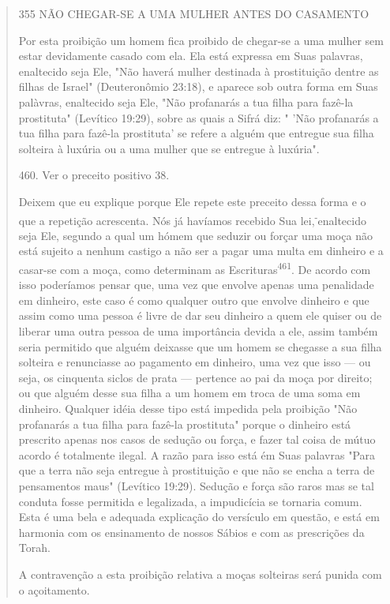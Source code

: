\begin{quote}
355 NÃO CHEGAR-SE A UMA MULHER ANTES DO CASAMENTO

Por esta proibição um homem fica proibido de chegar-se a uma mu­lher sem
estar devidamente casado com ela. Ela está expressa em Suas palavras,
enaltecido seja Ele, "Não haverá mulher destinada à prostituição dentre
as fi­lhas de Israel" (Deuteronômio 23:18), e aparece sob outra forma em
Suas palà­vras, enaltecido seja Ele, "Não profanarás a tua filha para
fazê-la prostituta" (Le­vítico 19:29), sobre as quais a Sifrá diz: "
'Não profanarás a tua filha para fazê-la prostituta' se refere a alguém
que entregue sua filha solteira à luxúria ou a uma mulher que se
entregue à luxúria".

460. Ver o preceito positivo 38.

Deixem que eu explique porque Ele repete este preceito dessa forma e o
que a repetição acrescenta. Nós já havíamos recebido Sua
lei,\textsuperscript{-}enaltecido seja Ele, segundo a qual um hómem que
seduzir ou forçar uma moça não está sujeito a nenhum castigo a não ser a
pagar uma multa em dinheiro e a casar-se com a moça, como determinam as
Escrituras\textsuperscript{461}. De acordo com isso poderíamos pen­sar
que, uma vez que envolve apenas uma penalidade em dinheiro, este caso é
como qualquer outro que envolve dinheiro e que assim como uma pessoa é
livre de dar seu dinheiro a quem ele quiser ou de liberar uma outra
pessoa de uma importância devida a ele, assim também seria permitido que
alguém deixas­se que um homem se chegasse a sua filha solteira e
renunciasse ao pagamento em dinheiro, uma vez que isso --- ou seja, os
cinquenta siclos de prata --- perten­ce ao pai da moça por direito; ou
que alguém desse sua filha a um homem em troca de uma soma em dinheiro.
Qualquer idéia desse tipo está impedida pela proibição "Não profanarás a
tua filha para fazê-la prostituta" porque o dinheiro está prescrito
apenas nos casos de sedução ou força, e fazer tal coisa de mútuo acordo
é totalmente ilegal. A razão para isso está ém Suas palavras "Para que a
terra não seja entregue à prostituição e que não se encha a terra de
pensamentos maus" (Levítico 19:29). Sedução e força são raros mas se tal
conduta fosse per­mitida e legalizada, a impudicícia se tornaria comum.
Esta é uma bela e adequa­da explicação do versículo em questão, e está
em harmonia com os ensinamen­to de nossos Sábios e com as prescrições da
Torah.

A contravenção a esta proibição relativa a moças solteiras será puni­da
com o açoitamento.
\end{quote}

